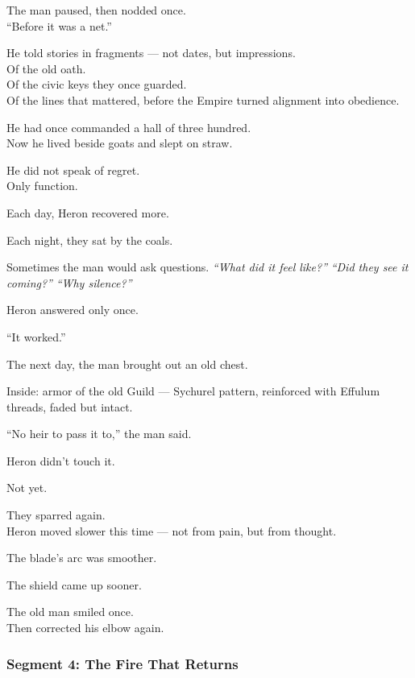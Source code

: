 \documentclass[9pt]{article}
\begin{document}
The man paused, then nodded once.\\
“Before it was a net.”

\vspace{1em}

He told stories in fragments — not dates, but impressions.\\
Of the old oath.\\
Of the civic keys they once guarded.\\
Of the lines that mattered, before the Empire turned alignment into obedience.

He had once commanded a hall of three hundred.\\
Now he lived beside goats and slept on straw.

He did not speak of regret.\\
Only function.

\vspace{1em}

Each day, Heron recovered more.

Each night, they sat by the coals.

Sometimes the man would ask questions.  
\textit{“What did it feel like?”}  
\textit{“Did they see it coming?”}  
\textit{“Why silence?”}

Heron answered only once.

“It worked.”

\vspace{1em}

The next day, the man brought out an old chest.

Inside: armor of the old Guild — Sychurel pattern, reinforced with Effulum threads, faded but intact.

“No heir to pass it to,” the man said.

Heron didn’t touch it.

Not yet.

\vspace{1em}

They sparred again.\\
Heron moved slower this time — not from pain, but from thought.

The blade’s arc was smoother.

The shield came up sooner.

The old man smiled once.\\
Then corrected his elbow again.

\newpage

\subsubsection*{Segment 4: The Fire That Returns}
\end{document}
